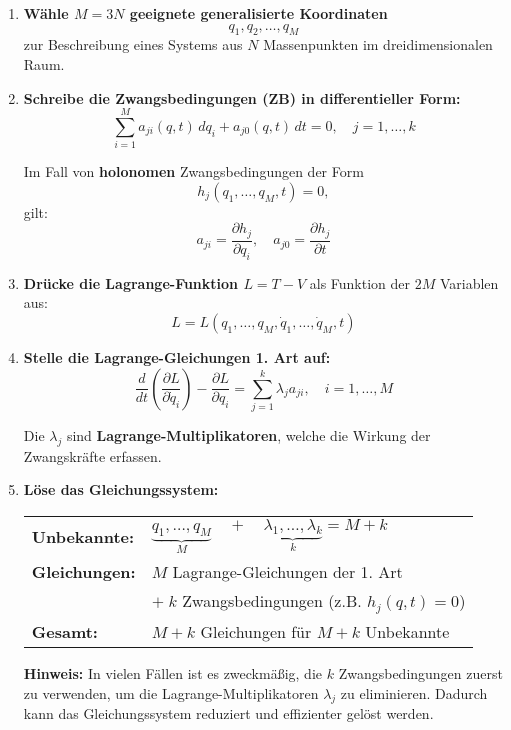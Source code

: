 \documentclass[10pt, letterpaper]{article}
\begin{document}
\begin{enumerate}[label=\textbf{\arabic*)}, itemsep=1.5em]

\item \textbf{Wähle \( M = 3N \) geeignete generalisierte Koordinaten}  
\[
q_1, q_2, \dotsc, q_M
\]
zur Beschreibung eines Systems aus \( N \) Massenpunkten im dreidimensionalen Raum.

\item \textbf{Schreibe die Zwangsbedingungen (ZB) in differentieller Form:}
\[
\sum_{i=1}^M a_{ji}(q, t) \, dq_i + a_{j0}(q, t)\, dt = 0, \quad j = 1, \dotsc, k
\]

Im Fall von \textbf{holonomen} Zwangsbedingungen der Form
\[
h_j(q_1, \dotsc, q_M, t) = 0,
\]
gilt:
\[
a_{ji} = \frac{\partial h_j}{\partial q_i}, 
\quad
a_{j0} = \frac{\partial h_j}{\partial t}
\]

\item \textbf{Drücke die Lagrange-Funktion \( L = T - V \)} als Funktion der \( 2M \) Variablen aus:
\[
L = L(q_1, \dotsc, q_M, \dot{q}_1, \dotsc, \dot{q}_M, t)
\]

\item \textbf{Stelle die Lagrange-Gleichungen 1. Art auf:}
\[
\frac{d}{dt} \left( \frac{\partial L}{\partial \dot{q}_i} \right) 
- \frac{\partial L}{\partial q_i} 
= \sum_{j=1}^k \lambda_j a_{ji}, 
\quad i = 1, \dotsc, M
\]

Die \(\lambda_j\) sind \textbf{Lagrange-Multiplikatoren}, welche die Wirkung der Zwangskräfte erfassen.

\item \textbf{Löse das Gleichungssystem:}

\vspace{0.5em}
\noindent
\begin{tabular}{@{}ll}
\textbf{Unbekannte:} 
& \( \underbrace{q_1, \dotsc, q_M}_{M} 
\quad + \quad 
\underbrace{\lambda_1, \dotsc, \lambda_k}_{k} 
= M + k \) \\[1ex]

\textbf{Gleichungen:} 
& \( M \) Lagrange-Gleichungen der 1. Art \\[0.5ex]
& \( + \; k \) Zwangsbedingungen (z.B. \( h_j(q, t) = 0 \)) \\[1ex]

\textbf{Gesamt:} 
& \( M + k \) Gleichungen für \( M + k \) Unbekannte
\end{tabular}

\vspace{1.5em}
\noindent
\textbf{Hinweis:}  
In vielen Fällen ist es zweckmäßig, die \( k \) Zwangsbedingungen zuerst zu verwenden, um die Lagrange-Multiplikatoren \( \lambda_j \) zu eliminieren. Dadurch kann das Gleichungssystem reduziert und effizienter gelöst werden.

\end{enumerate}
\end{document}
